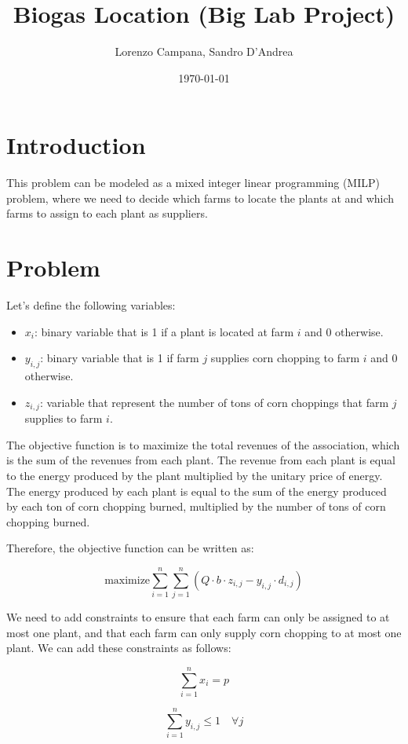 \documentclass{article}
\begin{document}
\title{Biogas Location (Big Lab Project)}
\author{Lorenzo Campana, Sandro D'Andrea}
\date{\today}
\maketitle

\section{Introduction}
This problem can be modeled as a mixed integer linear programming (MILP) problem, where we need to decide which 
farms to locate the plants at and which farms to assign to each plant as suppliers.

\section{Problem}
Let's define the following variables:
\begin{itemize}
    \item $x_i$: binary variable that is 1 if a plant is located at farm $i$ and 0 otherwise.
    \item  $y_{i,j}$: binary variable that is 1 if farm $j$ supplies corn chopping to farm $i$ and 0 otherwise.
    \item  $z_{i,j}$: variable that represent the number of tons of corn choppings that farm $j$ supplies to farm $i$.

\end{itemize}

The objective function is to maximize the total revenues of the association, which is the sum of the revenues from each plant. The revenue from each plant is equal to the energy produced by the plant multiplied by the unitary price of energy. The energy produced by each plant is equal to the sum of the energy produced by each ton of corn chopping burned, multiplied by the number of tons of corn chopping burned.

Therefore, the objective function can be written as:

$$\text{maximize} \sum_{i=1}^n \sum_{j=1}^n (Q \cdot b \cdot z_{i,j} - y_{i,j} \cdot d_{i,j})$$

We need to add constraints to ensure that each farm can 
only be assigned to at most one plant, and that each farm can only supply corn chopping to at most one plant. 
We can add these constraints as follows:

$$\sum_{i=1}^n x_i = p$$

$$\sum_{i=1}^n y_{i,j} \leq 1 \quad \forall j$$
\end{document}
